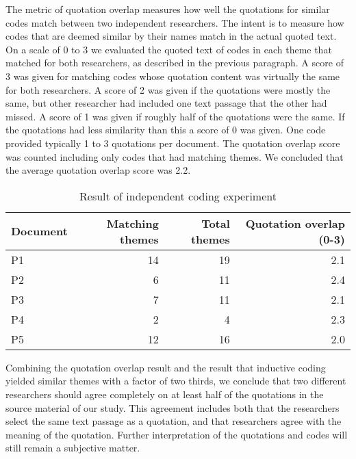 \documentclass[preprint,authoryear,12pt]{elsarticle}
\begin{document}
The metric of quotation overlap measures how well the quotations for similar
codes match between two independent researchers. The intent is to measure how
codes that are deemed similar by their names match in the actual quoted text. On
a scale of 0 to 3 we evaluated the quoted text of codes in each theme that
matched for both researchers, as described in the previous paragraph. A score of
3 was given for matching codes whose quotation content was virtually the same
for both researchers. A score of 2 was given if the quotations were mostly the
same, but other researcher had included one text passage that the other had
missed. A score of 1 was given if roughly half of the quotations were the same.
If the quotations had less similarity than this a score of 0 was given. One code
provided typically 1 to 3 quotations per document. The quotation overlap score
was counted including only codes that had matching themes. We concluded that the
average quotation overlap score was 2.2.

\begin{table}[h]
    \begin{tabular}{ l r r r }
        \toprule
        Document    &  Matching themes  &  Total themes  &  Quotation overlap (0-3) \\
        \midrule
        P1          &  14  &  19   &  2.1  \\
        P2          &   6  &  11   &  2.4  \\
        P3          &   7  &  11   &  2.1  \\
        P4          &   2  &   4   &  2.3  \\
        P5          &  12  &  16   &  2.0  \\
        \bottomrule
    \end{tabular}
    \caption{Result of independent coding experiment}
    \label{table:codingexperiment}
\end{table}

Combining the quotation overlap result and the result that inductive coding
yielded similar themes with a factor of two thirds, we conclude that two
different researchers should agree completely on at least half of the quotations
in the source material of our study. This agreement includes both that the
researchers select the same text passage as a quotation, and that researchers
agree with the meaning of the quotation. Further interpretation of the
quotations and codes will still remain a subjective matter.
\end{document}
